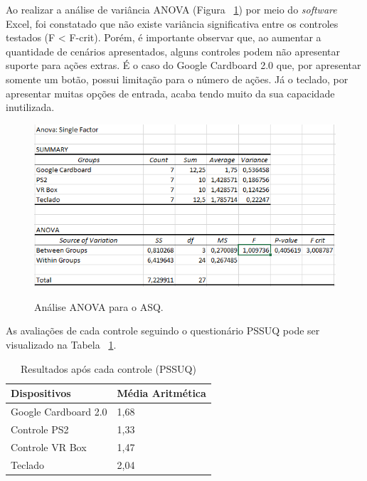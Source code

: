 Ao realizar a análise de variância ANOVA (Figura ~\ref{f.anovaasq}) por meio do \textit{software} Excel, foi constatado que não existe variância significativa entre os controles testados (F < F-crit). Porém, é importante observar que, ao aumentar a quantidade de cenários apresentados, alguns controles podem não apresentar suporte para ações extras. É o caso do Google Cardboard 2.0 que, por apresentar somente um botão, possui limitação para o número de ações. Já o teclado, por apresentar muitas opções de entrada, acaba tendo muito da sua capacidade inutilizada. 

\begin{figure}[H]
	\caption{\small Análise ANOVA para o ASQ.}
	\centering
	\includegraphics[scale=0.7]{Imagens/anovaasq.png}
	\label{f.anovaasq}
\end{figure}

As avaliações de cada controle seguindo o questionário PSSUQ pode ser visualizado na Tabela ~\ref{t.PSSUQ}. 

\begin{table}[H]	
	\caption{Resultados após cada controle (PSSUQ)} 
	\label{t.PSSUQ} 
	\centering
	\begin{tabular}{l|l}
		\textbf{\small Dispositivos } & \textbf{\small Média Aritmética}\\\hline
		
		{\small Google Cardboard 2.0} & {\small 1,68} \\\hline	
		
		{\small Controle PS2} & {\small 1,33} \\\hline		 
		
		{\small Controle VR Box} & {\small 1,47	}  \\\hline  
		
		{\small Teclado} & {\small 2,04	 } \\\hline	
	\end{tabular}
\end{table}

